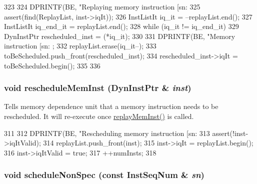 \begin{DoxyCode}
323 {
324     DPRINTF(BE, "Replaying memory instruction [sn:%
325     assert(find(ReplayList, inst->iqIt));
326     InstListIt iq_it = --replayList.end();
327     InstListIt iq_end_it = replayList.end();
328     while (iq_it != iq_end_it) {
329         DynInstPtr rescheduled_inst = (*iq_it);
330 
331         DPRINTF(BE, "Memory instruction [sn:%
      ;
332         replayList.erase(iq_it--);
333         toBeScheduled.push_front(rescheduled_inst);
334         rescheduled_inst->iqIt = toBeScheduled.begin();
335     }
336 }
\end{DoxyCode}
\hypertarget{classBackEnd_1_1InstQueue_aa9c46f45f491ef90a936c7e2b95f20aa}{
\subsubsection[{rescheduleMemInst}]{\setlength{\rightskip}{0pt plus 5cm}void rescheduleMemInst ({\bf DynInstPtr} \& {\em inst})}}
\label{classBackEnd_1_1InstQueue_aa9c46f45f491ef90a936c7e2b95f20aa}
Tells memory dependence unit that a memory instruction needs to be rescheduled. It will re-\/execute once \hyperlink{classBackEnd_1_1InstQueue_ae165df775b4de9e9430228c7f04c2bc9}{replayMemInst()} is called. 


\begin{DoxyCode}
311 {
312     DPRINTF(BE, "Rescheduling memory instruction [sn:%
313     assert(!inst->iqItValid);
314     replayList.push_front(inst);
315     inst->iqIt = replayList.begin();
316     inst->iqItValid = true;
317     ++numInsts;
318 }
\end{DoxyCode}
\hypertarget{classBackEnd_1_1InstQueue_acc2640b7a23376539d13b74725fcf7a9}{
\subsubsection[{scheduleNonSpec}]{\setlength{\rightskip}{0pt plus 5cm}void scheduleNonSpec (const {\bf InstSeqNum} \& {\em sn})}}
\label{classBackEnd_1_1InstQueue_acc2640b7a23376539d13b74725fcf7a9}



